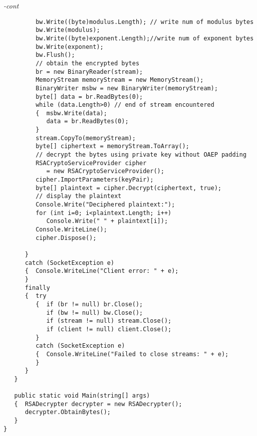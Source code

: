 \begin{figure*}\begin{program}\emph{-cont}\begin{verbatim}
         bw.Write((byte)modulus.Length); // write num of modulus bytes
         bw.Write(modulus);
         bw.Write((byte)exponent.Length);//write num of exponent bytes
         bw.Write(exponent);
         bw.Flush();
         // obtain the encrypted bytes
         br = new BinaryReader(stream);
         MemoryStream memoryStream = new MemoryStream();
         BinaryWriter msbw = new BinaryWriter(memoryStream);
         byte[] data = br.ReadBytes(0);
         while (data.Length>0) // end of stream encountered
         {  msbw.Write(data);
            data = br.ReadBytes(0);
         }
         stream.CopyTo(memoryStream);
         byte[] ciphertext = memoryStream.ToArray();
         // decrypt the bytes using private key without OAEP padding
         RSACryptoServiceProvider cipher
            = new RSACryptoServiceProvider();
         cipher.ImportParameters(keyPair);
         byte[] plaintext = cipher.Decrypt(ciphertext, true);
         // display the plaintext
         Console.Write("Deciphered plaintext:");
         for (int i=0; i<plaintext.Length; i++)
            Console.Write(" " + plaintext[i]);
         Console.WriteLine();
         cipher.Dispose();

      }
      catch (SocketException e)
      {  Console.WriteLine("Client error: " + e);
      }
      finally
      {  try
         {  if (br != null) br.Close();
            if (bw != null) bw.Close();
            if (stream != null) stream.Close();
            if (client != null) client.Close();
         }
         catch (SocketException e)
         {  Console.WriteLine("Failed to close streams: " + e);
         }
      }
   }

   public static void Main(string[] args)
   {  RSADecrypter decrypter = new RSADecrypter();
      decrypter.ObtainBytes();
   }
}
\end{verbatim}\end{program}\end{figure*}
